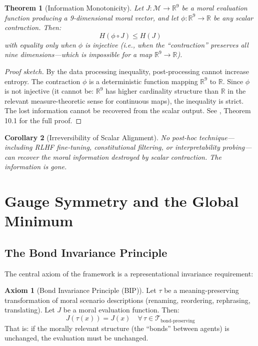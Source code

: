 \documentclass[12pt]{article}
\newtheorem{theorem}{Theorem}[section]
\newtheorem{corollary}[theorem]{Corollary}
\theoremstyle{definition}
\newtheorem{axiom}{Axiom}
\theoremstyle{remark}
\newcommand{\M}{\mathcal{M}}
\newcommand{\R}{\mathbb{R}}
\begin{document}
\begin{theorem}[Information Monotonicity]
\label{thm:info_mono}
Let $J: \M \to \R^9$ be a moral evaluation function producing a 9-dimensional moral vector, and let $\phi: \R^9 \to \R$ be any scalar contraction. Then:
\begin{equation}
H(\phi \circ J) \leq H(J)
\label{eq:info_mono}
\end{equation}
with equality only when $\phi$ is injective (i.e., when the ``contraction'' preserves all nine dimensions---which is impossible for a map $\R^9 \to \R$).
\end{theorem}

\begin{proof}[Proof sketch]
By the data processing inequality, post-processing cannot increase entropy. The contraction $\phi$ is a deterministic function mapping $\R^9$ to $\R$. Since $\phi$ is not injective (it cannot be: $\R^9$ has higher cardinality structure than $\R$ in the relevant measure-theoretic sense for continuous maps), the inequality is strict. The lost information cannot be recovered from the scalar output. See \citet{anon2026a}, Theorem 10.1 for the full proof.
\end{proof}

\begin{corollary}[Irreversibility of Scalar Alignment]
No post-hoc technique---including RLHF fine-tuning, constitutional filtering, or interpretability probing---can recover the moral information destroyed by scalar contraction. The information is \emph{gone}.
\end{corollary}


\section{Gauge Symmetry and the Global Minimum}
\label{sec:gauge}

\subsection{The Bond Invariance Principle}

The central axiom of the framework is a representational invariance requirement:

\begin{axiom}[Bond Invariance Principle (BIP)]
\label{axiom:bip}
Let $\tau$ be a meaning-preserving transformation of moral scenario descriptions (renaming, reordering, rephrasing, translating). Let $J$ be a moral evaluation function. Then:
\begin{equation}
J(\tau(x)) = J(x) \quad \forall\, \tau \in \mathcal{T}_{\text{bond-preserving}}
\label{eq:bip}
\end{equation}
That is: if the morally relevant structure (the ``bonds'' between agents) is unchanged, the evaluation must be unchanged.
\end{axiom}
\end{document}
